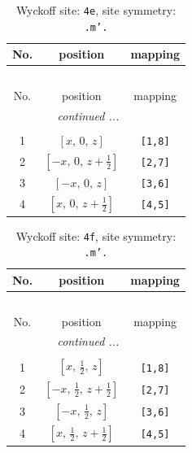 \documentclass[fleqn,8pt]{jsarticle}
\begin{document}
\begin{longtable}{ccc}
\caption{Wyckoff site: {\tt 4e}, site symmetry: {\tt .m'.}}
 \\
 \hline \hline
No. & position & mapping \\ \hline \endfirsthead

\multicolumn{2}{l}{\tablename\ \thetable{}} \\
 \hline \hline
No. & position & mapping \\ \hline \endhead

 \hline \hline
\multicolumn{2}{r}{\footnotesize\it continued ...} \\ \endfoot

 \hline \hline
\multicolumn{2}{r}{} \\ \endlastfoot

1 & $\left[ x,\, 0,\, z \right]$ & {\tt [1,8]} \\ \hline
2 & $\left[ - x,\, 0,\, z + \frac{1}{2} \right]$ & {\tt [2,7]} \\ \hline
3 & $\left[ - x,\, 0,\, z \right]$ & {\tt [3,6]} \\ \hline
4 & $\left[ x,\, 0,\, z + \frac{1}{2} \right]$ & {\tt [4,5]} \\
\end{longtable}
\renewcommand{\arraystretch}{1.2}
\begin{longtable}{ccc}
\caption{Wyckoff site: {\tt 4f}, site symmetry: {\tt .m'.}}
 \\
 \hline \hline
No. & position & mapping \\ \hline \endfirsthead

\multicolumn{2}{l}{\tablename\ \thetable{}} \\
 \hline \hline
No. & position & mapping \\ \hline \endhead

 \hline \hline
\multicolumn{2}{r}{\footnotesize\it continued ...} \\ \endfoot

 \hline \hline
\multicolumn{2}{r}{} \\ \endlastfoot

1 & $\left[ x,\, \frac{1}{2},\, z \right]$ & {\tt [1,8]} \\ \hline
2 & $\left[ - x,\, \frac{1}{2},\, z + \frac{1}{2} \right]$ & {\tt [2,7]} \\ \hline
3 & $\left[ - x,\, \frac{1}{2},\, z \right]$ & {\tt [3,6]} \\ \hline
4 & $\left[ x,\, \frac{1}{2},\, z + \frac{1}{2} \right]$ & {\tt [4,5]} \\
\end{longtable}
\end{document}
